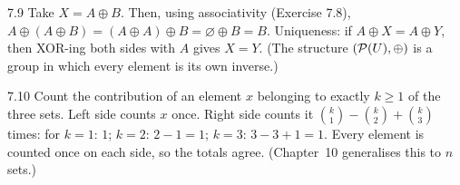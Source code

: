 \begin{solution}{7.9}
Take $X = A \oplus B$. Then, using associativity (Exercise 7.8),
$A \oplus (A \oplus B) = (A \oplus A) \oplus B = \varnothing \oplus B = B$.
Uniqueness: if $A \oplus X = A \oplus Y$, then XOR-ing both sides with $A$
gives $X = Y$. (The structure $(\mathcal{P}(U), \oplus)$ is a group in which
every element is its own inverse.)
\end{solution}

\begin{solution}{7.10}
Count the contribution of an element $x$ belonging to exactly $k \geq 1$ of
the three sets. Left side counts $x$ once. Right side counts it
$\binom{k}{1} - \binom{k}{2} + \binom{k}{3}$ times: for $k=1$: $1$; $k=2$:
$2 - 1 = 1$; $k=3$: $3 - 3 + 1 = 1$. Every element is counted once on each
side, so the totals agree. (Chapter~10 generalises this to $n$ sets.)
\end{solution}
